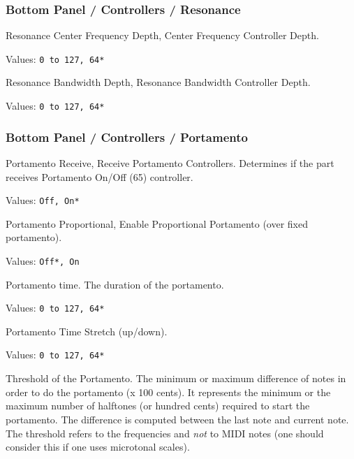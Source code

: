 \subsubsection{Bottom Panel / Controllers / Resonance}
\label{subsubsec:bottom_panel_controllers_resonance}

   \setcounter{ItemCounter}{0}      %

   Resonance Center Frequency Depth,
   Center Frequency Controller Depth.

   Values: \texttt{0 to 127, 64*}

   Resonance Bandwidth Depth,
   Resonance Bandwidth Controller Depth.

   Values: \texttt{0 to 127, 64*}

\subsubsection{Bottom Panel / Controllers / Portamento}
\label{subsubsec:bottom_panel_controllers_portamento}

   \setcounter{ItemCounter}{0}      %

   Portamento Receive,
   Receive Portamento Controllers.
   Determines if the part receives Portamento On/Off (65) controller.

   Values: \texttt{Off, On*}

   Portamento Proportional,
   Enable Proportional Portamento (over fixed portamento).

   Values: \texttt{Off*, On}

   Portamento time.
   The duration of the portamento.

   Values: \texttt{0 to 127, 64*}

   Portamento Time Stretch (up/down).

   Values: \texttt{0 to 127, 64*}

   Threshold of the Portamento.
   The minimum or maximum difference of notes in order
   to do the portamento (x 100 cents).
   It represents the minimum or the maximum number of halftones (or hundred
   cents) required to start the portamento. The difference is computed
   between the last note and current note.
   The threshold refers to the frequencies and \textsl{not} to MIDI notes (one
   should consider this if one uses microtonal scales).


